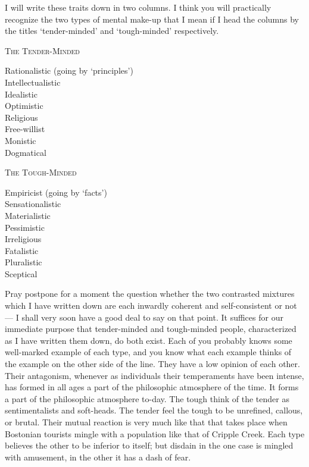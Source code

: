 \documentclass[]{article}
\begin{document}
I will write these traits down in two columns. I think you will
practically recognize the two types of mental make-up that I mean if
I head the columns by the titles `tender-minded' and `tough-minded'
respectively.

\medskip

\begin{minipage}{.45\linewidth}
\textsc{The Tender-Minded}\par
Rationalistic (going by `principles')\\
Intellectualistic\\
Idealistic\\
Optimistic\\
Religious\\
Free-willist\\
Monistic\\
Dogmatical
\end{minipage}\hfill
\begin{minipage}{.45\linewidth}
\textsc{The Tough-Minded}\par
Empiricist (going by `facts')\\ Sensationalistic\\ Materialistic\\
Pessimistic\\ Irreligious\\ Fatalistic\\ Pluralistic\\ Sceptical
\end{minipage}

\medskip

Pray postpone for a moment the question whether the two contrasted
mixtures which I have written down are each inwardly coherent and
self-consistent or not--- I shall very soon have a good deal to say on
that point. It suffices for our immediate purpose that tender-minded and
tough-minded people, characterized as I have written them down, do both
exist. Each of you probably knows some well-marked example of each type,
and you know what each example thinks of the example on the other side
of the line. They have a low opinion of each other. Their antagonism,
whenever as individuals their temperaments have been intense, has formed
in all ages a part of the philosophic atmosphere of the time. It forms a
part of the philosophic atmosphere to-day. The tough think of the tender
as sentimentalists and soft-heads. The tender feel the tough to be
unrefined, callous, or brutal. Their mutual reaction is very much like
that that takes place when Bostonian tourists mingle with a population
like that of Cripple Creek. Each type believes the other to be inferior
to itself; but disdain in the one case is mingled with amusement, in the
other it has a dash of fear.
\end{document}
